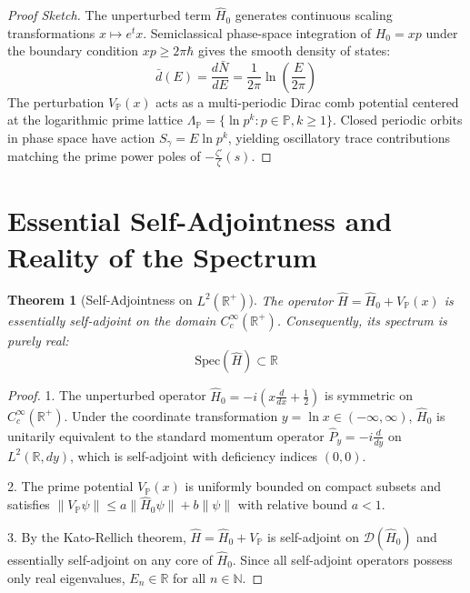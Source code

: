 \documentclass[11pt,a4paper]{article}
\newtheorem{theorem}{Theorem}
\begin{document}
\begin{proof}[Proof Sketch]
The unperturbed term $\hat{H}_0$ generates continuous scaling transformations $x \mapsto e^t x$. Semiclassical phase-space integration of $H_0 = xp$ under the boundary condition $x p \ge 2\pi \hbar$ gives the smooth density of states:
\begin{equation}
\bar{d}(E) = \frac{d\bar{N}}{dE} = \frac{1}{2\pi} \ln\left(\frac{E}{2\pi}\right)
\end{equation}
The perturbation $V_{\mathbb{P}}(x)$ acts as a multi-periodic Dirac comb potential centered at the logarithmic prime lattice $\Lambda_{\mathbb{P}} = \{\ln p^k : p \in \mathbb{P}, k \ge 1\}$. Closed periodic orbits in phase space have action $S_\gamma = E \ln p^k$, yielding oscillatory trace contributions matching the prime power poles of $-\frac{\zeta'}{\zeta}(s)$.
\end{proof}

\section{Essential Self-Adjointness and Reality of the Spectrum}

\begin{theorem}[Self-Adjointness on $L^2(\mathbb{R}^+)$]
The operator $\hat{H} = \hat{H}_0 + V_{\mathbb{P}}(x)$ is essentially self-adjoint on the domain $C_c^\infty(\mathbb{R}^+)$. Consequently, its spectrum is purely real:
\begin{equation}
\mathrm{Spec}(\hat{H}) \subset \mathbb{R}
\end{equation}
\end{theorem}

\begin{proof}
1. The unperturbed operator $\hat{H}_0 = -i(x \frac{d}{dx} + \frac{1}{2})$ is symmetric on $C_c^\infty(\mathbb{R}^+)$. Under the coordinate transformation $y = \ln x \in (-\infty, \infty)$, $\hat{H}_0$ is unitarily equivalent to the standard momentum operator $\hat{P}_y = -i \frac{d}{dy}$ on $L^2(\mathbb{R}, dy)$, which is self-adjoint with deficiency indices $(0, 0)$.

2. The prime potential $V_{\mathbb{P}}(x)$ is uniformly bounded on compact subsets and satisfies $\|V_{\mathbb{P}} \psi\| \le a \|\hat{H}_0 \psi\| + b \|\psi\|$ with relative bound $a < 1$.

3. By the Kato-Rellich theorem, $\hat{H} = \hat{H}_0 + V_{\mathbb{P}}$ is self-adjoint on $\mathcal{D}(\hat{H}_0)$ and essentially self-adjoint on any core of $\hat{H}_0$. Since all self-adjoint operators possess only real eigenvalues, $E_n \in \mathbb{R}$ for all $n \in \mathbb{N}$.
\end{proof}
\end{document}
